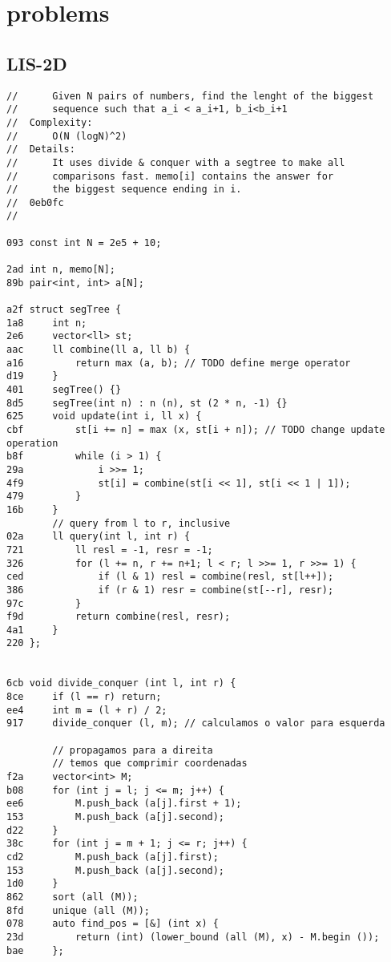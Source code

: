 \documentclass[11pt, a4paper, twoside]{article}
\begin{document}
%
%

\section{problems}

\subsection{ LIS-2D}
\begin{lstlisting}
//      Given N pairs of numbers, find the lenght of the biggest
//      sequence such that a_i < a_i+1, b_i<b_i+1
//  Complexity: 
//      O(N (logN)^2)
//  Details:
//      It uses divide & conquer with a segtree to make all
//      comparisons fast. memo[i] contains the answer for 
//      the biggest sequence ending in i.
//  0eb0fc
//

093 const int N = 2e5 + 10;

2ad int n, memo[N];
89b pair<int, int> a[N];

a2f struct segTree {
1a8     int n;
2e6     vector<ll> st;
aac     ll combine(ll a, ll b) {
a16         return max (a, b); // TODO define merge operator
d19     }
401     segTree() {}
8d5     segTree(int n) : n (n), st (2 * n, -1) {}
625     void update(int i, ll x) {
cbf         st[i += n] = max (x, st[i + n]); // TODO change update operation
b8f         while (i > 1) {
29a             i >>= 1;
4f9             st[i] = combine(st[i << 1], st[i << 1 | 1]);
479         }
16b     }
        // query from l to r, inclusive
02a     ll query(int l, int r) {
721         ll resl = -1, resr = -1;
326         for (l += n, r += n+1; l < r; l >>= 1, r >>= 1) {
ced             if (l & 1) resl = combine(resl, st[l++]);
386             if (r & 1) resr = combine(st[--r], resr);
97c         }
f9d         return combine(resl, resr);
4a1     }
220 };


6cb void divide_conquer (int l, int r) {
8ce     if (l == r) return;
ee4     int m = (l + r) / 2;
917     divide_conquer (l, m); // calculamos o valor para esquerda
    
        // propagamos para a direita
        // temos que comprimir coordenadas
f2a     vector<int> M;
b08     for (int j = l; j <= m; j++) {
ee6         M.push_back (a[j].first + 1);
153         M.push_back (a[j].second);
d22     }
38c     for (int j = m + 1; j <= r; j++) {
cd2         M.push_back (a[j].first);
153         M.push_back (a[j].second);
1d0     }
862     sort (all (M));
8fd     unique (all (M));
078     auto find_pos = [&] (int x) {
23d         return (int) (lower_bound (all (M), x) - M.begin ());
bae     };
    

\end{lstlisting}
\end{document}
